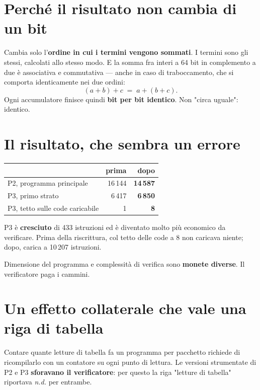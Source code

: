 \documentclass[11pt,a4paper,oneside]{report}
\begin{document}
\section{Perché il risultato non cambia di un bit}

Cambia solo l'\textbf{ordine in cui i termini vengono sommati}. I termini sono
gli stessi, calcolati allo stesso modo. E la somma fra interi a 64 bit in
complemento a due è associativa e commutativa --- anche in caso di traboccamento,
che si comporta identicamente nei due ordini:
\[
  (a + b) + c \;=\; a + (b + c) .
\]
Ogni accumulatore finisce quindi \textbf{bit per bit identico}. Non "circa
uguale": identico.

\section{Il risultato, che sembra un errore}

\begin{center}
\small
\begin{tabular}{@{}lrr@{}}
\toprule
& \textbf{prima} & \textbf{dopo} \\
\midrule
P2, programma principale & 16\,144 & \textbf{14\,587} \\
P3, primo strato & 6\,417 & \textbf{6\,850} \\
P3, tetto sulle code caricabile & 1 & \textbf{8} \\
\bottomrule
\end{tabular}
\end{center}

\begin{lezione}
P3 è \textbf{cresciuto} di 433 istruzioni ed è diventato molto più economico da
verificare. Prima della riscrittura, col tetto delle code a 8 non caricava
niente; dopo, carica a 10\,207 istruzioni.

Dimensione del programma e complessità di verifica sono \textbf{monete diverse}.
Il verificatore paga i cammini.
\end{lezione}

\section{Un effetto collaterale che vale una riga di tabella}

Contare quante letture di tabella fa un programma per pacchetto richiede di
ricompilarlo con un contatore su ogni punto di lettura. Le versioni strumentate
di P2 e P3 \textbf{sforavano il verificatore}: per questo la riga "letture di
tabella" riportava \emph{n.d.} per entrambe.
\end{document}

